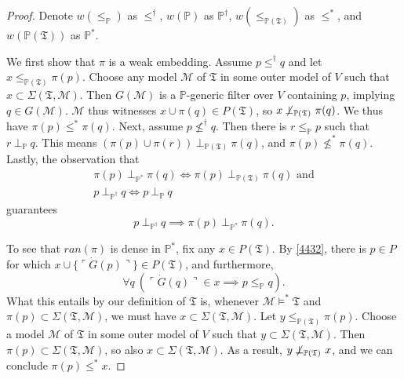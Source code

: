 \documentclass[12pt, twoside]{memoir}
\numberwithin{equation}{section}
\theoremstyle{definition}
\theoremstyle{remark}
\theoremstyle{definition}
\theoremstyle{definition}
\theoremstyle{definition}
\theoremstyle{remark}
\begin{document}
\begin{proof}
Denote $w(\leq_{\mathbb{P}})$ as $\leq^{\dagger}$, $w(\mathbb{P})$ as $\mathbb{P}^{\dagger}$, $w(\leq_{\mathbb{P}(\mathfrak{T})})$ as $\leq^*$, and $w(\mathbb{P}(\mathfrak{T}))$ as $\mathbb{P}^*$. 

We first show that $\pi$ is a weak embedding. Assume $p \leq^{\dagger} q$ and let $x \leq_{\mathbb{P}(\mathfrak{T})} \pi(p)$. Choose any model $\mathcal{M}$ of $\mathfrak{T}$ in some outer model of $V$ such that $x \subset \Sigma(\mathfrak{T}, \mathcal{M})$. Then $G(\mathcal{M})$ is a $\mathbb{P}$-generic filter over $V$ containing $p$, implying $q \in G(\mathcal{M})$. $\mathcal{M}$ thus witnesses $x \cup \pi(q) \in P(\mathfrak{T})$, so $x \not \! \! \bot_{\mathbb{P}(\mathfrak{T})} \ \pi(q)$. We thus have $\pi(p) \leq^* \pi(q)$. Next, assume $p \not \leq^{\dagger} q$. Then there is $r \leq_{\mathbb{P}} p$ such that $r \ \bot_{\mathbb{P}} \ q$. This means $(\pi(p) \cup \pi(r)) \ \bot_{\mathbb{P}(\mathfrak{T})} \ \pi(q)$, and $\pi(p) \not \leq^* \pi(q)$. Lastly, the observation that
\begin{gather*}
    \pi(p) \ \bot_{\mathbb{P}^*} \ \pi(q) \iff \pi(p) \ \bot_{\mathbb{P}(\mathfrak{T})} \ \pi(q) \text{ and} \\
    p \ \bot_{\mathbb{P}^{\dagger}} \ q \iff p \ \bot_{\mathbb{P}} \ q
\end{gather*}
guarantees $$p \ \bot_{\mathbb{P}^{\dagger}} \ q \implies  \pi(p) \ \bot_{\mathbb{P}^*} \ \pi(q) \text{.}$$

To see that $ran(\pi)$ is dense in $\mathbb{P}^*$, fix any $x \in P(\mathfrak{T})$. By \ref{4432}, there is $p \in P$ for which $x \cup \{\ulcorner \dot{G}(p) \urcorner\} \in P(\mathfrak{T})$, and furthermore, $$\forall q \ (\ulcorner \dot{G}(q) \urcorner \in x \implies p \leq_{\mathbb{P}} q) \text{.}$$ What this entails by our definition of $\mathfrak{T}$ is, whenever $\mathcal{M} \models^* \mathfrak{T}$ and $\pi(p) \subset \Sigma(\mathfrak{T}, \mathcal{M})$, we must have $x \subset \Sigma(\mathfrak{T}, \mathcal{M})$. Let $y \leq_{\mathbb{P}(\mathfrak{T})} \pi(p)$. Choose a model $\mathcal{M}$ of $\mathfrak{T}$ in some outer model of $V$ such that $y \subset \Sigma(\mathfrak{T}, \mathcal{M})$. Then $\pi(p) \subset \Sigma(\mathfrak{T}, \mathcal{M})$, so also $x \subset \Sigma(\mathfrak{T}, \mathcal{M})$. As a result, $y \not \! \! \bot_{\mathbb{P}(\mathfrak{T})} \ x$, and we can conclude $\pi(p) \leq^* x$.
\end{proof}
\end{document}
